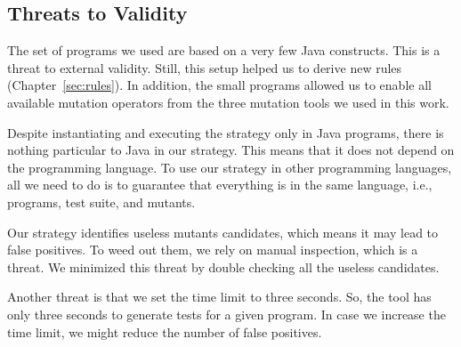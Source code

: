 

\subsection{Threats to Validity}
\label{sec:identifying-threats-to-validity}

The set of programs we used are based on a very few Java constructs. 
This is a threat to external validity. 
Still, this setup helped us to derive \NumberOfNewHeuristics new rules (Chapter~\ref{sec:rules}). 
In addition, the small programs allowed us to enable all available mutation operators from the three mutation tools we used in this work.


Despite instantiating and executing the strategy only in Java programs, there is nothing particular to Java in our strategy. 
This means that it does not depend on the programming language. 
To use our strategy in other programming languages, all we need to do is to guarantee that everything is in the same language, i.e., programs, test suite, and mutants.

Our strategy identifies useless mutants candidates, which means it may lead to false positives. 
To weed out them, we rely on manual inspection, which is a threat. 
We minimized this threat by double checking all the useless candidates.

Another threat is that we set the \randoop{} time limit to three seconds. 
So, the tool has only three seconds to generate tests for a given program. 
In case we increase the time limit, we might reduce the number of false positives.



